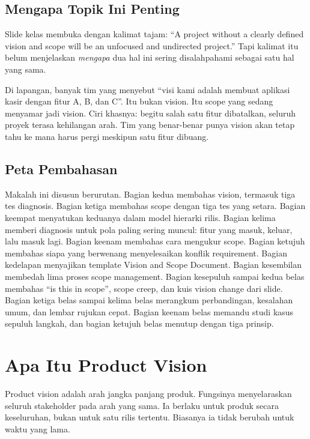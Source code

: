 \documentclass[11pt,a4paper]{article}
\begin{document}
\subsection{Mengapa Topik Ini Penting}

Slide kelas membuka dengan kalimat tajam: ``A project without a clearly defined vision and scope will be an unfocused and undirected project.'' Tapi kalimat itu belum menjelaskan \textit{mengapa} dua hal ini sering disalahpahami sebagai satu hal yang sama.

Di lapangan, banyak tim yang menyebut ``visi kami adalah membuat aplikasi kasir dengan fitur A, B, dan C''. Itu bukan vision. Itu scope yang sedang menyamar jadi vision. Ciri khasnya: begitu salah satu fitur dibatalkan, seluruh proyek terasa kehilangan arah. Tim yang benar-benar punya vision akan tetap tahu ke mana harus pergi meskipun satu fitur dibuang.

\subsection{Peta Pembahasan}

Makalah ini disusun berurutan. Bagian kedua membahas vision, termasuk tiga tes diagnosis. Bagian ketiga membahas scope dengan tiga tes yang setara. Bagian keempat menyatukan keduanya dalam model hierarki rilis. Bagian kelima memberi diagnosis untuk pola paling sering muncul: fitur yang masuk, keluar, lalu masuk lagi. Bagian keenam membahas cara mengukur scope. Bagian ketujuh membahas siapa yang berwenang menyelesaikan konflik requirement. Bagian kedelapan menyajikan template Vision and Scope Document. Bagian kesembilan membedah lima proses scope management. Bagian kesepuluh sampai kedua belas membahas ``is this in scope'', scope creep, dan kuis vision change dari slide. Bagian ketiga belas sampai kelima belas merangkum perbandingan, kesalahan umum, dan lembar rujukan cepat. Bagian keenam belas memandu studi kasus sepuluh langkah, dan bagian ketujuh belas menutup dengan tiga prinsip.

\section{Apa Itu Product Vision}

Product vision adalah arah jangka panjang produk. Fungsinya menyelaraskan seluruh stakeholder pada arah yang sama. Ia berlaku untuk produk secara keseluruhan, bukan untuk satu rilis tertentu. Biasanya ia tidak berubah untuk waktu yang lama.
\end{document}
